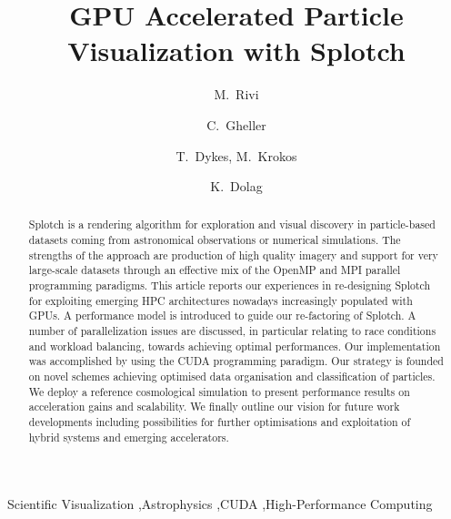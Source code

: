 \documentclass[preprint,5pt]{elsarticle}
\begin{document}
\begin{frontmatter}

\title{GPU Accelerated Particle Visualization with Splotch}

\author{M.~Rivi}
\address{Department of Physics, University of Oxford, OX1 3RH, United Kingdom}
      
\author{C.~Gheller}
\address{ETH-CSCS, via Trevano 131, 6900 Lugano, Switzerland}
  
\author{T.~Dykes, M.~Krokos}
\address{School of Creative Technologies, University of Portsmouth, PO1 2DJ, United Kingdom}

\author{K.~Dolag}
\address{University Observatory Munich, Scheinerstrasse 1, D-81679 Munich, Germany}



\maketitle

\begin{abstract}
Splotch is a rendering algorithm for exploration and visual discovery in
particle-based datasets coming from astronomical observations or
numerical simulations. The strengths of the approach are production of
high quality imagery and support for very large-scale datasets through an
effective mix of the OpenMP and MPI parallel programming paradigms. This
article reports our experiences in re-designing Splotch for exploiting
emerging HPC architectures nowadays increasingly populated with GPUs. A
performance model is introduced to guide our re-factoring of Splotch.  A number of
parallelization issues are discussed, in particular relating to race
conditions and workload balancing, towards achieving optimal
performances. Our implementation was accomplished by using the CUDA
programming paradigm. Our strategy is founded on novel schemes achieving optimised data organisation and classification of particles. We deploy a reference cosmological simulation to present
performance results on acceleration gains and scalability. We finally
outline our vision for future work developments including possibilities
for further optimisations and exploitation of hybrid systems and emerging accelerators.
\end{abstract}

\begin{keyword}
Scientific Visualization \sep Astrophysics \sep CUDA \sep High-Performance  Computing 
\end{keyword}

\end{frontmatter}
\end{document}
